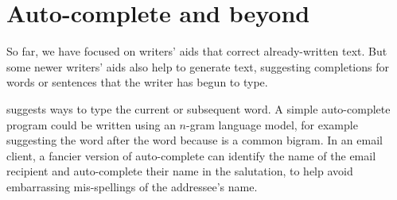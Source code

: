   
 
 \section{Auto-complete and beyond}
 
So far, we have focused on writers' aids that correct already-written text.  But some newer writers' aids also help to generate text, suggesting completions for words or sentences that the writer has begun to type.

 suggests ways to type the current or subsequent word.  A simple auto-complete program could be written using an $n$-gram language model, for example suggesting the word  after the word  because  is a common bigram.  In an email client, a fancier version of auto-complete can identify the name of the email recipient and  auto-complete  their name in the salutation, to help avoid embarrassing mis-spellings of the addressee's name.

